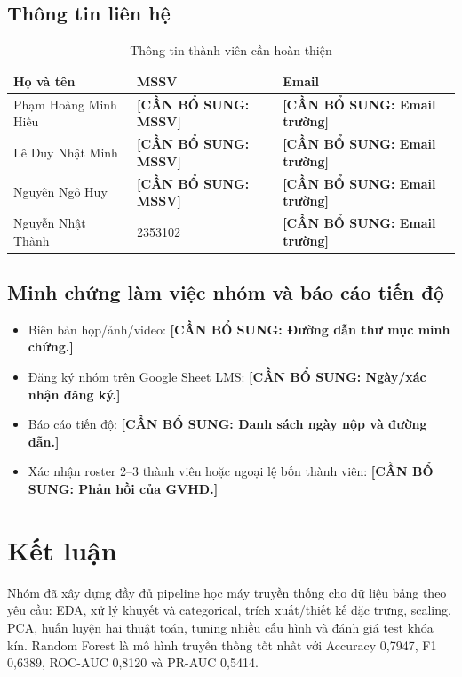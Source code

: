 \documentclass[12pt,a4paper,oneside]{report}
\newcommand{\placeholder}[1]{%
  \colorbox{placeholderbg}{\textcolor{placeholderred}{\textbf{[CẦN BỔ SUNG: #1]}}}%
}
\begin{document}
\section{Thông tin liên hệ}

\begin{table}[H]
\centering
\caption{Thông tin thành viên cần hoàn thiện}\label{tab:member-contact}
\begin{tabularx}{\textwidth}{l l X}
\toprule
\textbf{Họ và tên} & \textbf{MSSV} & \textbf{Email} \\
\midrule
Phạm Hoàng Minh Hiếu & \placeholder{MSSV} & \placeholder{Email trường} \\
Lê Duy Nhật Minh & \placeholder{MSSV} & \placeholder{Email trường} \\
Nguyên Ngô Huy & \placeholder{MSSV} & \placeholder{Email trường} \\
Nguyễn Nhật Thành & 2353102 & \placeholder{Email trường} \\
\bottomrule
\end{tabularx}
\end{table}

\section{Minh chứng làm việc nhóm và báo cáo tiến độ}

\begin{itemize}
  \item Biên bản họp/ảnh/video: \placeholder{Đường dẫn thư mục minh chứng.}
  \item Đăng ký nhóm trên Google Sheet LMS: \placeholder{Ngày/xác nhận đăng ký.}
  \item Báo cáo tiến độ: \placeholder{Danh sách ngày nộp và đường dẫn.}
  \item Xác nhận roster 2--3 thành viên hoặc ngoại lệ bốn thành viên: \placeholder{Phản hồi của GVHD.}
\end{itemize}

\chapter{Kết luận}

Nhóm đã xây dựng đầy đủ pipeline học máy truyền thống cho dữ liệu bảng theo yêu cầu: EDA, xử lý khuyết và categorical, trích xuất/thiết kế đặc trưng, scaling, PCA, huấn luyện hai thuật toán, tuning nhiều cấu hình và đánh giá test khóa kín. Random Forest là mô hình truyền thống tốt nhất với Accuracy 0,7947, F1 0,6389, ROC-AUC 0,8120 và PR-AUC 0,5414.
\end{document}
